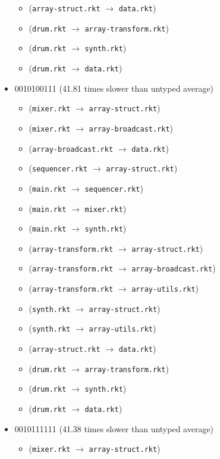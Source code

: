 \documentclass{article}
\newcommand{\mono}[1]{\texttt{#1}}
\begin{document}
\begin{itemize}
\begin{itemize}
  \item (\mono{array-struct.rkt} $\rightarrow$ \mono{data.rkt})
  \item (\mono{drum.rkt} $\rightarrow$ \mono{array-transform.rkt})
  \item (\mono{drum.rkt} $\rightarrow$ \mono{synth.rkt})
  \item (\mono{drum.rkt} $\rightarrow$ \mono{data.rkt})
  \end{itemize}
\item 0010100111 (41.81 times slower than untyped average)
  \begin{itemize}
  \item (\mono{mixer.rkt} $\rightarrow$ \mono{array-struct.rkt})
  \item (\mono{mixer.rkt} $\rightarrow$ \mono{array-broadcast.rkt})
  \item (\mono{array-broadcast.rkt} $\rightarrow$ \mono{data.rkt})
  \item (\mono{sequencer.rkt} $\rightarrow$ \mono{array-struct.rkt})
  \item (\mono{main.rkt} $\rightarrow$ \mono{sequencer.rkt})
  \item (\mono{main.rkt} $\rightarrow$ \mono{mixer.rkt})
  \item (\mono{main.rkt} $\rightarrow$ \mono{synth.rkt})
  \item (\mono{array-transform.rkt} $\rightarrow$ \mono{array-struct.rkt})
  \item (\mono{array-transform.rkt} $\rightarrow$ \mono{array-broadcast.rkt})
  \item (\mono{array-transform.rkt} $\rightarrow$ \mono{array-utils.rkt})
  \item (\mono{synth.rkt} $\rightarrow$ \mono{array-struct.rkt})
  \item (\mono{synth.rkt} $\rightarrow$ \mono{array-utils.rkt})
  \item (\mono{array-struct.rkt} $\rightarrow$ \mono{data.rkt})
  \item (\mono{drum.rkt} $\rightarrow$ \mono{array-transform.rkt})
  \item (\mono{drum.rkt} $\rightarrow$ \mono{synth.rkt})
  \item (\mono{drum.rkt} $\rightarrow$ \mono{data.rkt})
  \end{itemize}
\item 0010111111 (41.38 times slower than untyped average)
  \begin{itemize}
  \item (\mono{mixer.rkt} $\rightarrow$ \mono{array-struct.rkt})

\end{itemize}
\end{itemize}
\end{document}
